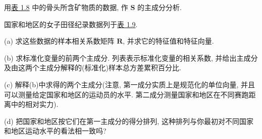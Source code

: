 \quad 用\hyperref[tab:1.8]{表 1.8} 中的骨头所含矿物质的数据, 作 $\mathbf{S}$ 的主成分分析.

\quad 国家和地区的女子田径纪录数据列于\hyperref[tab:1.9]{表 1.9}.

(a) 求这些数据的样本相关系数矩阵 $\mathbf{R}$, 并求它的特征值和特征向量.

(b) 求标准化变量的前两个主成分. 列表表示标准化变量的相关系数, 并给出主成分及由这两个主成分解释的(标准化)样本总方差累积百分比.

(c) 解释(b)中求得的两个主成分(注意, 第一成分实质上是规范化的单位向量, 并且可以测量给定国家和地区的运动员的水平. 第二成分测量国家和地区在不同赛跑距离中的相对实力).

(d) 把国家和地区按它们在第一主成分的得分排列, 这种排列与你最初对不同国家和地区运动水平的看法相一致吗?
